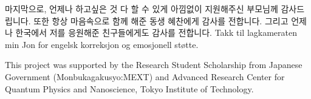 \documentclass[11pt]{book}
\begin{document}
마지막으로, 언제나 하고싶은 것 다 할 수 있게 아낌없이 지원해주신 부모님께 감사드립니다. 또한 항상 마음속으로 함께 해준 동생 혜찬에게 감사를 전합니다. 그리고 언제나 한국에서 저를 응원해준 친구들에게도 감사를 전합니다. Takk til lagkameraten min Jon for engelsk korreksjon og emosjonell støtte. 


This project was supported by the Research Student Scholarship from Japanese Government (Monbukagakusyo:MEXT) and Advanced Research Center for Quantum Physics and Nanoscience, Tokyo Institute of Technology.
\end{document}
